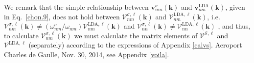 We remark that the simple relationship between 
$\mathbf{v}^{\sigma}_{nm}(\mathbf{k})$ 
and 
$\mathbf{v}^{\mathrm{LDA}}_{nm}(\mathbf{k})$,
given in 
Eq.~\eqref{chon.9}, 
does not hold between
$\boldsymbol{\mathcal{V}}^{\sigma,\ell}_{nm}(\mathbf{k})$   
and 
$\boldsymbol{\mathcal{V}}^{\mathrm{LDA},\ell}_{nm}(\mathbf{k})$,
i.e.
$\boldsymbol{\mathcal{V}}^{\sigma,\ell}_{nm}(\mathbf{k})\ne
(\omega^\sigma_{nm}/\omega_{nm})
\boldsymbol{\mathcal{V}}^{\mathrm{LDA},\ell}_{nm}(\mathbf{k})$ 
and
$\boldsymbol{\mathcal{V}}^{\sigma,\ell}_{nn}(\mathbf{k})\ne
\boldsymbol{\mathcal{V}}^{\mathrm{LDA},\ell}_{nn}(\mathbf{k})$
,
and thus, to calculate
$\boldsymbol{\mathcal{V}}^{\sigma,\ell}_{nm}(\mathbf{k})$ 
we must calculate the matrix elements of $\boldsymbol{\mathcal{V}}^{\mathcal{S},\ell}$ and
$\boldsymbol{\mathcal{V}}^{\mathrm{LDA},\ell}$ (separately)
according to the expressions of
Appendix \ref{calvs}. {\color{red}Aeroport Charles de Gaulle, Nov. 30,
2014, see Appendix \ref{voila}}.


